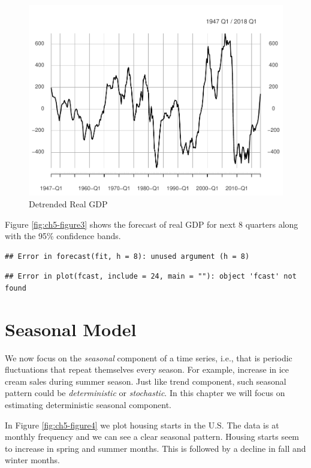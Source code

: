 \documentclass[]{book}
\theoremstyle{definition}
\theoremstyle{definition}
\theoremstyle{definition}
\theoremstyle{remark}
\begin{document}
\begin{figure}

{\centering \includegraphics[width=0.8\linewidth]{bookdown-demo_files/figure-latex/ch5-figure2-1} 

}

\caption{Detrended Real GDP}\label{fig:ch5-figure2}
\end{figure}

Figure \ref{fig:ch5-figure3} shows the forecast of real GDP for next 8 quarters along with the 95\% confidence bands.

\begin{verbatim}
## Error in forecast(fit, h = 8): unused argument (h = 8)
\end{verbatim}

\begin{verbatim}
## Error in plot(fcast, include = 24, main = ""): object 'fcast' not found
\end{verbatim}

\hypertarget{seasonal-model}{%
\section{Seasonal Model}\label{seasonal-model}}

We now focus on the \emph{seasonal} component of a time series, i.e., that is periodic fluctuations that repeat themselves every season. For example, increase in ice cream sales during summer season. Just like trend component, such seasonal pattern could be \emph{deterministic} or \emph{stochastic}. In this chapter we will focus on estimating deterministic seasonal component.

In Figure \ref{fig:ch5-figure4} we plot housing starts in the U.S. The data is at monthly frequency and we can see a clear seasonal pattern. Housing starts seem to increase in spring and summer months. This is followed by a decline in fall and winter months.
\end{document}
